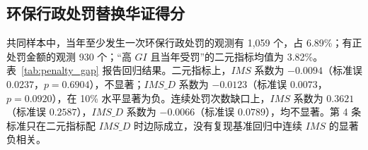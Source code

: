 \documentclass[12pt,a4paper]{article}
\begin{document}
\begin{table}[htbp]
\centering
\caption{沟通侧与绩效侧成分拆解}
\label{tab:component_split}
\renewcommand{\arraystretch}{1.25}
\end{table}

\subsection{环保行政处罚替换华证得分}

共同样本中，当年至少发生一次环保行政处罚的观测有 1,059 个，占 6.89\%；有正处罚金额的观测 930 个；``高 $GI$ 且当年受罚''的二元指标均值为 3.82\%。表~\ref{tab:penalty_gap} 报告回归结果。二元指标上，$IMS$ 系数为 $-0.0094$（标准误 $0.0237$，$p=0.6904$），不显著；$IMS\_D$ 系数为 $-0.0123$（标准误 $0.0073$，$p=0.0920$），在 10\% 水平显著为负。连续处罚次数缺口上，$IMS$ 系数为 $0.3621$（标准误 $0.2587$），$IMS\_D$ 系数为 $-0.0066$（标准误 $0.0789$），均不显著。第 4 条标准只在二元指标配 $IMS\_D$ 时边际成立，没有复现基准回归中连续 $IMS$ 的显著负相关。
\end{document}
